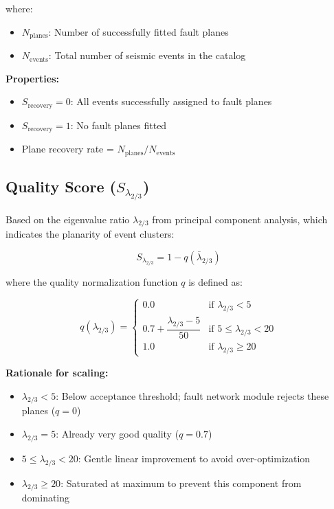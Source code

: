 \documentclass[11pt,a4paper]{article}
\begin{document}
where:
\begin{itemize}
    \item $N_{\text{planes}}$: Number of successfully fitted fault planes
    \item $N_{\text{events}}$: Total number of seismic events in the catalog
\end{itemize}

\textbf{Properties:}
\begin{itemize}
    \item $S_{\text{recovery}} = 0$: All events successfully assigned to fault planes
    \item $S_{\text{recovery}} = 1$: No fault planes fitted
    \item Plane recovery rate = $N_{\text{planes}}/N_{\text{events}}$
\end{itemize}

\subsection{Quality Score ($S_{\lambda_{2/3}}$)}

Based on the eigenvalue ratio $\lambda_{2/3}$ from principal component analysis, which indicates the planarity of event clusters:

\begin{equation}
\label{eq:quality_score}
S_{\lambda_{2/3}} = 1 - q(\bar{\lambda}_{2/3})
\end{equation}

where the quality normalization function $q$ is defined as:

\begin{equation}
\label{eq:quality_function}
q(\lambda_{2/3}) = 
\begin{cases}
    0.0 & \text{if } \lambda_{2/3} < 5 \\[6pt]
    0.7 + \dfrac{\lambda_{2/3} - 5}{50} & \text{if } 5 \leq \lambda_{2/3} < 20 \\[6pt]
    1.0 & \text{if } \lambda_{2/3} \geq 20
\end{cases}
\end{equation}

\textbf{Rationale for scaling:}
\begin{itemize}
    \item $\lambda_{2/3} < 5$: Below acceptance threshold; fault network module rejects these planes ($q = 0$)
    \item $\lambda_{2/3} = 5$: Already very good quality ($q = 0.7$)
    \item $5 \leq \lambda_{2/3} < 20$: Gentle linear improvement to avoid over-optimization
    \item $\lambda_{2/3} \geq 20$: Saturated at maximum to prevent this component from dominating
\end{itemize}
\end{document}
